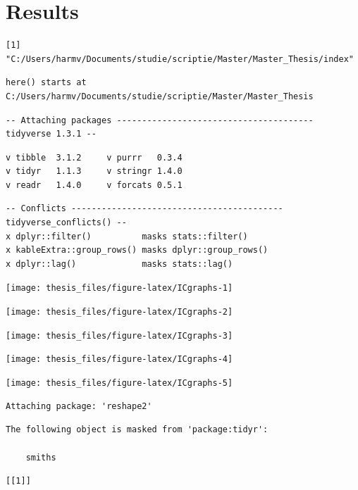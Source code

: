 \documentclass[a4paper,11pt]{article}
\begin{document}
\hypertarget{results}{%
\section{Results}\label{results}}
\begin{verbatim}
[1] "C:/Users/harmv/Documents/studie/scriptie/Master/Master_Thesis/index"
\end{verbatim}
\begin{verbatim}
here() starts at C:/Users/harmv/Documents/studie/scriptie/Master/Master_Thesis
\end{verbatim}
\begin{verbatim}
-- Attaching packages --------------------------------------- tidyverse 1.3.1 --
\end{verbatim}
\begin{verbatim}
v tibble  3.1.2     v purrr   0.3.4
v tidyr   1.1.3     v stringr 1.4.0
v readr   1.4.0     v forcats 0.5.1
\end{verbatim}
\begin{verbatim}
-- Conflicts ------------------------------------------ tidyverse_conflicts() --
x dplyr::filter()          masks stats::filter()
x kableExtra::group_rows() masks dplyr::group_rows()
x dplyr::lag()             masks stats::lag()
\end{verbatim}
\begin{center}\texttt{[image: thesis\_files/figure-latex/ICgraphs-1]} \end{center}
\begin{center}\texttt{[image: thesis\_files/figure-latex/ICgraphs-2]} \end{center}
\begin{center}\texttt{[image: thesis\_files/figure-latex/ICgraphs-3]} \end{center}
\begin{center}\texttt{[image: thesis\_files/figure-latex/ICgraphs-4]} \end{center}
\begin{center}\texttt{[image: thesis\_files/figure-latex/ICgraphs-5]} \end{center}
\begin{verbatim}
Attaching package: 'reshape2'
\end{verbatim}
\begin{verbatim}
The following object is masked from 'package:tidyr':

    smiths
\end{verbatim}
\begin{verbatim}
[[1]]
\end{verbatim}
\end{document}
